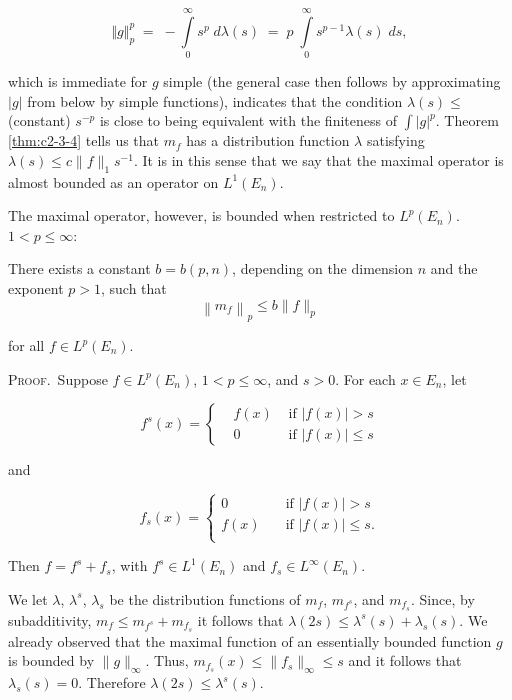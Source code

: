 \begin{equation}\label{eq:c2-3-6}
\Vert g\Vert_{p}^{p}\;=\;-\int\limits_{0}^{\infty}s^{p}\;d\lambda(s)\;=\;p\;\int\limits_{0}^{\infty}s^{p-1}\lambda(s)\;d s,
\end{equation}

which is immediate for $g$ simple (the general case then follows by approximating $|g|$ from below by simple functions), indicates that the condition $\lambda(s) \leq$ (constant) $s^{-p}$ is close to being equivalent with the finiteness of $\int |g|^{p}$. Theorem \ref{thm:c2-3-4} tells us that $m_f$ has a distribution function $\lambda$ satisfying $\lambda(s) \leq c \|f\|_1 s^{-1}$. It is in this sense that we say that the maximal operator is almost bounded as an operator on $L^1(E_n)$.

The maximal operator, however, is bounded when restricted to $L^p(E_n)$. $1 < p \leq \infty$:

\begin{theorem}
\label{thm:c2-3-7}
There exists a constant $b = b(p, n)$, depending on the dimension $n$ and the exponent $p > 1$, such that
\[
\left\|m_{f}\right\|_{p}\leq b\|f\|_{p}
\]

for all $f \in L^{p}(E_{n})$.
\end{theorem}

\textsc{Proof.}\ Suppose $f \in L^p(E_n)$, $1 < p \leq \infty$, and $s > 0$. For each $x \in E_n$, let

\[
f^{s}(x)=\left\{\begin{aligned}&f(x)&\text{ if }|f(x)|>s\\ &0&\text{ if }|f(x)|\leq s\end{aligned}\right.
\]

and

\[
f_{s}(x)=\left\{\begin{matrix}{0}&{\quad\text{if }|f(x)|>s}\\ {f(x)}&{\quad\text{if }|f(x)|\leq s.}\\ \end{matrix}\right.
\]

Then $f = f^s + f_s$, with $f^s \in L^1(E_n)$ and $f_s \in L^\infty(E_n)$.

We let $\lambda$, $\lambda^{s}$, $\lambda_{s}$ be the distribution functions of $m_{f}$, $m_{f^{s}}$, and $m_{f_{s}}$. Since, by subadditivity, $m_{f} \leq m_{f^{s}} + m_{f_{s}}$ it follows that $\lambda(2s) \leq \lambda^{s}(s) + \lambda_{s}(s)$. We already observed that the maximal function of an essentially bounded function $g$ is bounded by $\|g\|_{\infty}$. Thus, $m_{f_{s}}(x) \leq \|f_{s}\|_{\infty} \leq s$ and it follows that $\lambda_{s}(s) = 0$. Therefore $\lambda(2s) \leq \lambda^{s}(s)$.

